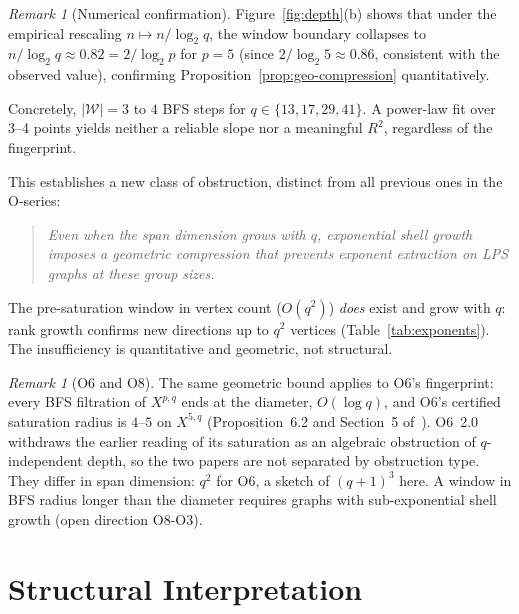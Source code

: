 \documentclass[11pt,a4paper]{article}
\theoremstyle{definition}
\theoremstyle{remark}
\newtheorem{remark}[theorem]{Remark}
\begin{document}
    \begin{remark}[Numerical confirmation]
      \label{rem:fig4-collapse}
      Figure~\ref{fig:depth}(b) shows that under the empirical rescaling
      $n \mapsto n/\log_2 q$, the window boundary collapses to
      $n/\log_2 q \approx 0.82 = 2/\log_2 p$ for $p = 5$
      (since $2/\log_2 5 \approx 0.86$, consistent with the observed value),
      confirming Proposition~\ref{prop:geo-compression} quantitatively.
    \end{remark}

    Concretely, $|\mathcal{W}| = 3$ to $4$ BFS steps for $q \in \{13,17,29,41\}$.
    A power-law fit over 3--4 points yields neither a reliable slope nor a
    meaningful $R^2$, regardless of the fingerprint.

    This establishes a new class of obstruction, distinct from all previous ones in the
    O-series:
    \begin{quote}
      \emph{Even when the span dimension grows with $q$,
        exponential shell growth imposes a geometric compression
        that prevents exponent extraction on LPS graphs at these group sizes.}
    \end{quote}

    The pre-saturation window in vertex count ($O(q^2)$) \emph{does} exist and grow
    with $q$: rank growth confirms new directions up to $q^2$ vertices
    (Table~\ref{tab:exponents}).
    The insufficiency is quantitative and geometric, not structural.

    \begin{remark}[O6 and O8]
      \label{rem:not-o6}
      The same geometric bound applies to O6's fingerprint: every BFS filtration of $X^{p,q}$
      ends at the diameter, $O(\log q)$, and O6's certified saturation radius is $4$--$5$
      on $X^{5,q}$ (Proposition~6.2 and Section~5 of~\cite{Beau2026a10}).
      O6~2.0 withdraws the earlier reading of its saturation as an algebraic obstruction of
      $q$-independent depth, so the two papers are not separated by obstruction type.
      They differ in span dimension: $q^2$ for O6, a sketch of $(q+1)^3$ here.
      A window in BFS radius longer than the diameter requires graphs with sub-exponential shell
      growth (open direction O8-O3).
    \end{remark}

  \section{Structural Interpretation}
  \label{sec:interpretation}
\end{document}
